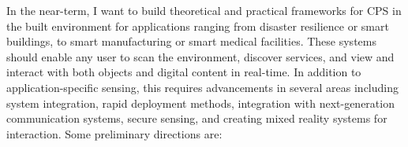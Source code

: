 \documentclass[10pt]{article}
\begin{document}

In the near-term, I want to build theoretical and practical frameworks for CPS in the built environment for applications ranging from disaster resilience or smart buildings, to smart manufacturing or smart medical facilities. 
These systems should enable any user to scan the environment, discover services, and view and interact with both objects and digital content in real-time. %
In addition to application-specific sensing, this requires advancements in several areas including system integration, rapid deployment methods, integration with next-generation communication systems, secure sensing, and creating mixed reality systems for interaction. Some preliminary directions are:

\end{document}
